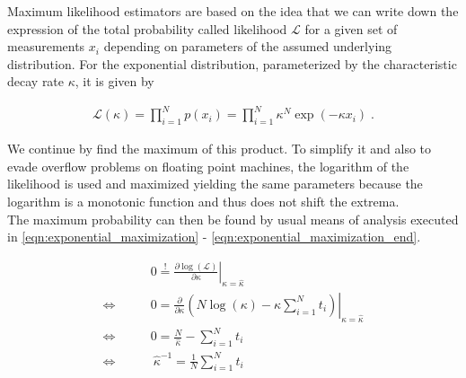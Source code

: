 Maximum likelihood estimators are based on the idea that we can write down the expression of the total probability called likelihood $\mathcal{L}$ for a given set of measurements $x_i$ depending on parameters of the assumed underlying distribution. For the exponential distribution, parameterized by the characteristic decay rate $\kappa$, it is given by

\begin{align}
\label{eqn:exponential_product}
\mathcal{L}(\kappa) = \prod_{i=1}^N p(x_i) = \prod_{i=1}^N \kappa^N \exp\left( - \kappa x_i \right ) \; \text{.}
\end{align}

We continue by find the maximum of this product. To simplify it and also to evade overflow problems on floating point machines, the logarithm of the likelihood is used and maximized yielding the same parameters because the logarithm is a monotonic function and thus does not shift the extrema.\\
The maximum probability can then be found by usual means of analysis executed in \autoref{eqn:exponential_maximization} - \autoref{eqn:exponential_maximization_end}.

\begin{align}
\label{eqn:exponential_maximization}
& 0 \stackrel{!}{=} \left. \frac{\partial \log (\mathcal{L})}{\partial \kappa} \right|_{\kappa=\hat{\kappa}}\\
\Leftrightarrow \qquad  &0 = \left. \frac{\partial}{\partial \kappa} \left( N \log(\kappa) - \kappa \sum_{i=1}^N t_i \right)  \right|_{\kappa=\hat{\kappa}} \\
\Leftrightarrow \qquad &0 = \frac{N}{\hat{\kappa}} - \sum_{i=1}^N t_i \\
\label{eqn:exponential_maximization_end}
\Leftrightarrow  \qquad & \!\!\!\!\!\!\!\!\: \hat{\kappa}^{-1} = \frac{1}{N} \sum_{i=1}^N t_i  
\end{align}

